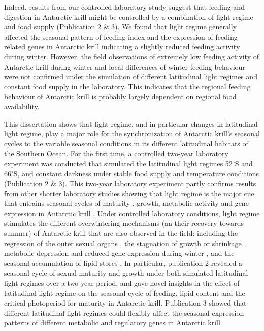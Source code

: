 Indeed, results from our controlled laboratory study suggest that feeding and
digestion in Antarctic krill might be controlled by a combination of light
regime and food supply (Publication 2 \& 3). We found that light regime
generally affected the seasonal pattern of feeding index and the expression of
feeding-related genes in Antarctic krill indicating a slightly reduced feeding
activity during winter. However, the field observations of extremely low
feeding activity of Antarctic krill during winter \citep{meyer_seasonal_2010}
and local differences of winter feeding behaviour \citep{schmidt_feeding_2014}
were not confirmed under the simulation of different latitudinal light regimes
and constant food supply in the laboratory. This indicates that the regional
feeding behaviour of Antarctic krill is probably largely dependent on regional
food availability.

This dissertation shows that light regime, and in particular changes in
latitudinal light regime, play a major role for the synchronization of
Antarctic krill's seasonal cycles to the variable seasonal conditions in its
different latitudinal habitats of the Southern Ocean. For the first time, a
controlled two-year laboratory experiment was conducted that simulated the
latitudinal light regimes 52$^{\circ}$S and 66$^{\circ}$S, and constant
darkness under stable food supply and temperature conditions (Publication 2 \&
3). This two-year laboratory experiment partly confirms results from other
shorter laboratory studies showing that light regime is the major cue that
entrains seasonal cycles of maturity \citep{brown_flexible_2011}, growth,
metabolic activity and gene expression in Antarctic krill
\citep{piccolin_seasonal_2018}. Under controlled laboratory conditions, light
regime stimulates the different overwintering mechanisms (an their recovery
towards summer) of Antarctic krill that are also observed in the field:
including the regression of the outer sexual organs \citep{siegel_krill_2012},
the stagnation of growth or shrinkage \citep{meyer_seasonal_2010,
quetin_behavioral_1991}, metabolic depression and reduced gene expression
during winter \citep{meyer_seasonal_2010, seear_seasonal_2012}, and the
seasonal accumulation of lipid stores \citep{meyer_seasonal_2010}. In
particular, publication 2 revealed a seasonal cycle of sexual maturity and
growth under both simulated latitudinal light regimes over a two-year period,
and gave novel insights in the effect of latitudinal light regime on the
seasonal cycle of feeding, lipid content and the critical photoperiod for
maturity in Antarctic krill. Publication 3 showed that different latitudinal
light regimes could flexibly affect the seasonal expression patterns of
different metabolic and regulatory genes in Antarctic krill. 

